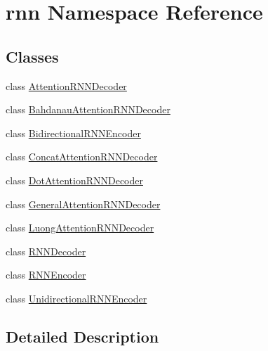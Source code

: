 \hypertarget{namespacernn}{}\section{rnn Namespace Reference}
\label{namespacernn}
\subsection*{Classes}
\begin{DoxyCompactItemize}
\item 
class \hyperlink{classrnn_1_1AttentionRNNDecoder}{Attention\+R\+N\+N\+Decoder}
\item 
class \hyperlink{classrnn_1_1BahdanauAttentionRNNDecoder}{Bahdanau\+Attention\+R\+N\+N\+Decoder}
\item 
class \hyperlink{classrnn_1_1BidirectionalRNNEncoder}{Bidirectional\+R\+N\+N\+Encoder}
\item 
class \hyperlink{classrnn_1_1ConcatAttentionRNNDecoder}{Concat\+Attention\+R\+N\+N\+Decoder}
\item 
class \hyperlink{classrnn_1_1DotAttentionRNNDecoder}{Dot\+Attention\+R\+N\+N\+Decoder}
\item 
class \hyperlink{classrnn_1_1GeneralAttentionRNNDecoder}{General\+Attention\+R\+N\+N\+Decoder}
\item 
class \hyperlink{classrnn_1_1LuongAttentionRNNDecoder}{Luong\+Attention\+R\+N\+N\+Decoder}
\item 
class \hyperlink{classrnn_1_1RNNDecoder}{R\+N\+N\+Decoder}
\item 
class \hyperlink{classrnn_1_1RNNEncoder}{R\+N\+N\+Encoder}
\item 
class \hyperlink{classrnn_1_1UnidirectionalRNNEncoder}{Unidirectional\+R\+N\+N\+Encoder}
\end{DoxyCompactItemize}


\subsection{Detailed Description}
\begin{DoxyVerb}\end{DoxyVerb}
 